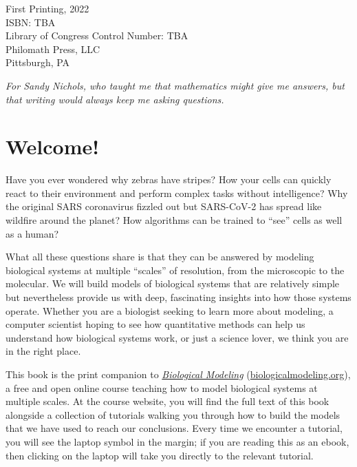 \noindent First Printing, 2022\\

\noindent ISBN: TBA\\

\noindent Library of Congress Control Number: TBA\\

\noindent Philomath Press, LLC\\
Pittsburgh, PA
\addtocounter{page}{-1}


\begin{dedication}
\textit{For Sandy Nichols, who taught me that mathematics might give me answers, but that writing would always keep me asking questions.}\\[\baselineskip]
\thispagestyle{empty}
\end{dedication}

\newpage
{}

\addtocounter{page}{-1}


\newpage
{}
\chapter{Welcome!}

Have you ever wondered why zebras have stripes? How your cells can quickly react to their environment and perform complex tasks without intelligence? Why the original SARS coronavirus fizzled out but SARS-CoV-2 has spread like wildfire around the planet? How algorithms can be trained to ``see'' cells as well as a human?

What all these questions share is that they can be answered by modeling biological systems at multiple ``scales'' of resolution, from the microscopic to the molecular. We will build models of biological systems that are relatively simple but nevertheless provide us with deep, fascinating insights into how those systems operate. Whether you are a biologist seeking to learn more about modeling, a computer scientist hoping to see how quantitative methods can help us understand how biological systems work, or just a science lover, we think you are in the right place.

This book is the print companion to \href{https://biologicalmodeling.org}{\textit{Biological Modeling}} (\href{https://biologicalmodeling.org}{biologicalmodeling.org}), a free and open online course teaching how to model biological systems at multiple scales. At the course website, you will find the full text of this book alongside a collection of tutorials walking you through how to build the models that we have used to reach our conclusions. Every time we encounter a tutorial, you will see the laptop symbol in the margin; if you are reading this as an ebook, then clicking on the laptop will take you directly to the relevant tutorial.\tutorial[]

